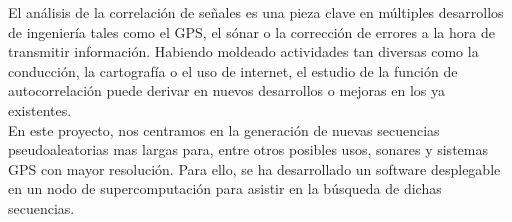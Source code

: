 El análisis de la correlación de señales es una pieza clave en múltiples
desarrollos de ingeniería tales como el GPS, el sónar o la corrección de errores
a la hora de transmitir información. Habiendo moldeado actividades tan diversas
como la conducción, la cartografía o el uso de internet, el estudio de la
función de autocorrelación puede derivar en nuevos desarrollos o mejoras en
los ya existentes. \\

En este proyecto, nos centramos en la generación de nuevas secuencias
pseudoaleatorias mas largas para, entre otros posibles usos, sonares y sistemas
GPS con mayor resolución. Para ello, se ha desarrollado un software desplegable
en un nodo de supercomputación para asistir en la búsqueda de dichas
secuencias.
